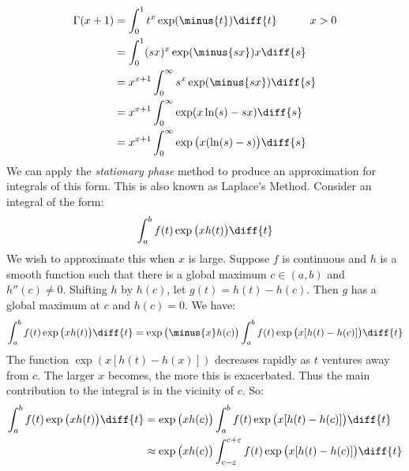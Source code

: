         \begin{subequations}
            \begin{align}
                \Gamma(x+1)&=\int_{0}^{1}t^{x}\exp(\minus{t})\diff{t}
                \quad\quad\quad{x}>0\\
                &=\int_{0}^{1}
                    (sx)^{x}\exp(\minus{sx})x\diff{s}\\
                &=x^{x+1}\int_{0}^{\infty}
                    s^{x}\exp(\minus{sx})\diff{s}\\
                &=x^{x+1}\int_{0}^{\infty}
                    \exp(x\ln(s)-sx)\diff{s}\\
                &=x^{x+1}\int_{0}^{\infty}
                    \exp\big(x(\ln(s)-s)\big)\diff{s}
            \end{align}
        \end{subequations}
        We can apply the \textit{stationary phase} method to produce
        an approximation for integrals of this form. This is also
        known as Laplace's Method. Consider an integral of the
        form:
        \begin{equation}
            \int_{a}^{b}f(t)\exp\big(xh(t)\big)\diff{t}
        \end{equation}
        We wish to approximate this when $x$ is large. Suppose
        $f$ is continuous and $h$ is a smooth function such that
        there is a global maximum $c\in(a,b)$ and $h''(c)\ne{0}$.
        Shifting $h$ by $h(c)$, let $g(t)=h(t)-h(c)$. Then
        $g$ has a global maximum at $c$ and $h(c)=0$. We have:
        \begin{equation}
            \int_{a}^{b}f(t)\exp\big(xh(t)\big)\diff{t}=
            \exp\big(\minus{x}h(c)\big)
            \int_{a}^{b}f(t)\exp\big(x[h(t)-h(c)]\big)\diff{t}
        \end{equation}
        The function $\exp(x[h(t)-h(x)])$ decreases rapidly as
        $t$ ventures away from $c$. The larger $x$ becomes, the
        more this is exacerbated. Thus the main contribution to
        the integral is in the vicinity of $c$. So:
        \begin{align}
            \int_{a}^{b}f(t)\exp\big(xh(t)\big)\diff{t}
            &=\exp\big(xh(c)\big)\int_{a}^{b}f(t)
                \exp\big(x[h(t)-h(c)]\big)\diff{t}\\
            &\approx\exp\big(xh(c)\big)
                \int_{c-\varepsilon}^{c+\varepsilon}
                f(t)\exp\big(x[h(t)-h(c)]\big)\diff{t}
        \end{align}
